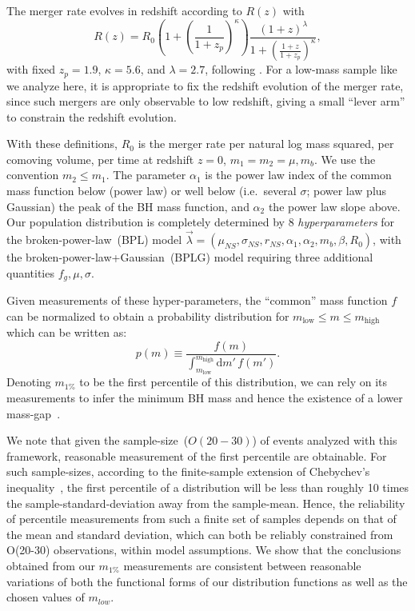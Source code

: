 \documentclass[modern]{aastex631}
\newcommand{\dd}{\ensuremath{\mathrm{d}}}
\begin{document}
The merger rate evolves in redshift according to $R(z)$ with 
\begin{equation}
    R(z) = R_0 \left( 1 + \left( \frac{1}{1 + z_p} \right)^\kappa \right) \frac{\left( 1 + z \right)^\lambda}{1 + \left( \frac{1+z}{1+z_p} \right)^\kappa}, 
\end{equation}
with fixed $z_p = 1.9$, $\kappa = 5.6$, and $\lambda = 2.7$, following
\citet{Madau2014}.  For a low-mass sample like we analyze here, it is
appropriate to fix the redshift evolution of the merger rate, since such mergers
are only observable to low redshift, giving a small ``lever arm'' to constrain
the redshift evolution.

With these definitions, $R_0$ is the merger rate per natural log mass squared,
per comoving volume, per time at redshift $z = 0$, $m_1 = m_2 = \mu, m_b$.  We
use the convention $m_2 \leq m_1$.  The parameter $\alpha_1$ is the power law
index of the common mass function below (power law) or well below (i.e.\ several
$\sigma$; power law plus Gaussian) the peak of the BH mass function, and
$\alpha_2$ the power law slope above.  Our population distribution is completely
determined by 8 \textit{hyperparameters} for the broken-power-law~(BPL) model
$\vec{\lambda}=(\mu_{NS}, \sigma_{NS}, r_{NS}, \alpha_1,\alpha_2,m_b, \beta,
R_0)$, with the broken-power-law+Gaussian~(BPLG) model requiring three
additional quantities $f_g,\mu,\sigma$.

Given measurements of these hyper-parameters, the ``common'' mass function $f$ can be normalized to obtain a probability distribution
for $m_\mathrm{low} \leq m \leq m_\mathrm{high}$ which can be written as:
\begin{equation}
    \label{eq:pm-definition}
    p(m) \equiv \frac{f(m)}{\int_{m_\mathrm{low}}^{m_\mathrm{high}} \dd m' \, f(m')}.
\end{equation}
\noindent Denoting $m_{1\%}$ to be the first percentile of this distribution, we can rely on its measurements to infer the minimum BH mass and hence the existence of a lower mass-gap~\citep{Farr:2010tu}. 

We note that given the sample-size~($O(20-30)$) of events analyzed with this framework, reasonable measurement of the first percentile are obtainable. For such sample-sizes, according to the finite-sample extension of Chebychev's inequality~\citep{Saw01051984, Kaban2012-yi}, the first percentile of a distribution will be less than roughly 10 times the sample-standard-deviation away from the sample-mean. Hence, the reliability of percentile measurements from such a finite set of samples depends on that of the mean and standard deviation, which can both be reliably constrained from O(20-30) observations, within model assumptions. We show that the conclusions obtained from our $m_{1\%}$ measurements are consistent between reasonable variations of both the functional forms of our distribution functions as well as the chosen values of $m_{low}$.
\end{document}
